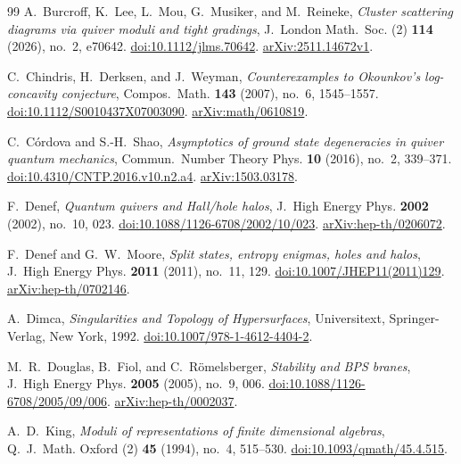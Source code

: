 \documentclass[11pt,a4paper]{article}
\numberwithin{equation}{section}
\theoremstyle{definition}
\theoremstyle{remark}
\begin{document}
\begin{thebibliography}{99}
\setlength{\itemsep}{1pt}
A.~Burcroff, K.~Lee, L.~Mou, G.~Musiker, and M.~Reineke,
\emph{Cluster scattering diagrams via quiver moduli and tight gradings},
J.~London Math.~Soc. (2) \textbf{114} (2026), no.~2, e70642.
\href{https://doi.org/10.1112/jlms.70642}{doi:10.1112/jlms.70642}.
\href{https://arxiv.org/abs/2511.14672v1}{arXiv:2511.14672v1}.

C.~Chindris, H.~Derksen, and J.~Weyman,
\emph{Counterexamples to Okounkov's log-concavity conjecture},
Compos.~Math. \textbf{143} (2007), no.~6, 1545--1557.
\href{https://doi.org/10.1112/S0010437X07003090}{doi:10.1112/S0010437X07003090}.
\href{https://arxiv.org/abs/math/0610819}{arXiv:math/0610819}.

C.~C\'ordova and S.-H.~Shao,
\emph{Asymptotics of ground state degeneracies in quiver quantum mechanics},
Commun.~Number Theory Phys. \textbf{10} (2016), no.~2, 339--371.
\href{https://doi.org/10.4310/CNTP.2016.v10.n2.a4}{doi:10.4310/CNTP.2016.v10.n2.a4}.
\href{https://arxiv.org/abs/1503.03178}{arXiv:1503.03178}.

F.~Denef, \emph{Quantum quivers and Hall/hole halos},
J.~High Energy Phys. \textbf{2002} (2002), no.~10, 023.
\href{https://doi.org/10.1088/1126-6708/2002/10/023}{doi:10.1088/1126-6708/2002/10/023}.
\href{https://arxiv.org/abs/hep-th/0206072}{arXiv:hep-th/0206072}.

F.~Denef and G.~W.~Moore,
\emph{Split states, entropy enigmas, holes and halos},
J.~High Energy Phys. \textbf{2011} (2011), no.~11, 129.
\href{https://doi.org/10.1007/JHEP11(2011)129}{doi:10.1007/JHEP11(2011)129}.
\href{https://arxiv.org/abs/hep-th/0702146}{arXiv:hep-th/0702146}.

A.~Dimca, \emph{Singularities and Topology of Hypersurfaces},
Universitext, Springer-Verlag, New York, 1992.
\href{https://doi.org/10.1007/978-1-4612-4404-2}{doi:10.1007/978-1-4612-4404-2}.

M.~R.~Douglas, B.~Fiol, and C.~R\"omelsberger,
\emph{Stability and BPS branes},
J.~High Energy Phys. \textbf{2005} (2005), no.~9, 006.
\href{https://doi.org/10.1088/1126-6708/2005/09/006}{doi:10.1088/1126-6708/2005/09/006}.
\href{https://arxiv.org/abs/hep-th/0002037}{arXiv:hep-th/0002037}.

A.~D.~King, \emph{Moduli of representations of finite dimensional algebras},
Q.~J.~Math. Oxford (2) \textbf{45} (1994), no.~4, 515--530.
\href{https://doi.org/10.1093/qmath/45.4.515}{doi:10.1093/qmath/45.4.515}.


\end{thebibliography}
\end{document}
